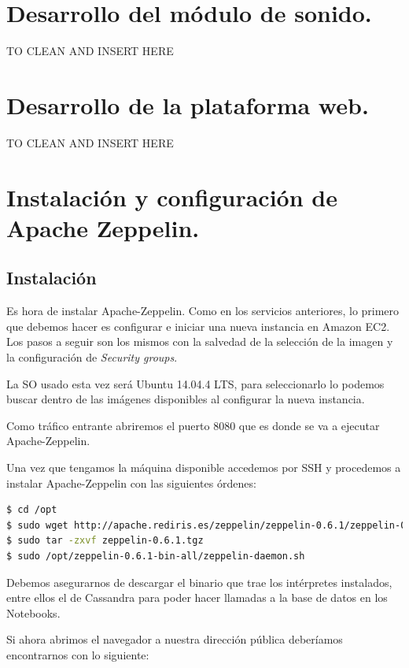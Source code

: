 \newpage

\section{Desarrollo del módulo de sonido.}
TO CLEAN AND INSERT HERE
\newpage


\section{Desarrollo de la plataforma web.}
TO CLEAN AND INSERT HERE
\newpage


\section{Instalación y configuración de Apache Zeppelin.}

\subsection{Instalación}
Es hora de instalar Apache-Zeppelin. Como en los servicios anteriores, lo primero que debemos hacer es configurar e iniciar una nueva instancia en Amazon EC2. Los pasos a seguir son los mismos con la salvedad de la selección de la imagen y la configuración de \textit{Security groups}.

\bigskip

La SO usado esta vez será Ubuntu 14.04.4 LTS, para seleccionarlo lo podemos buscar dentro de las imágenes disponibles al configurar la nueva instancia.

Como tráfico entrante abriremos el puerto 8080 que es donde se va a ejecutar Apache-Zeppelin.

Una vez que tengamos la máquina disponible accedemos por SSH y procedemos a instalar Apache-Zeppelin con las siguientes órdenes:

\begin{lstlisting}[language=bash,caption={Instalación de Apache-Zeppelin},label={lst:pi1}]
$ cd /opt
$ sudo wget http://apache.rediris.es/zeppelin/zeppelin-0.6.1/zeppelin-0.6.1.tgz
$ sudo tar -zxvf zeppelin-0.6.1.tgz
$ sudo /opt/zeppelin-0.6.1-bin-all/zeppelin-daemon.sh
\end{lstlisting}

Debemos asegurarnos de descargar el binario que trae los intérpretes instalados, entre ellos el de Cassandra para poder hacer llamadas a la base de datos en los Notebooks.

Si ahora abrimos el navegador a nuestra dirección pública deberíamos encontrarnos con lo siguiente:

